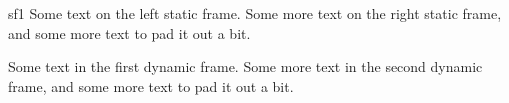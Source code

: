 \documentclass{article}
\begin{document}


\mbox{}

\newpage\mbox{}

\begin{staticcontents*}{sf1}
Some text on the left static frame.
Some more text on the right static frame, and
some more text to pad it out a bit.
\end{staticcontents*}

\newpage\mbox{}

\begin{dynamiccontents}{1}
Some text in the first dynamic frame.
Some more text in the second dynamic frame, and
some more text to pad it out a bit.
\end{dynamiccontents}
\end{document}

